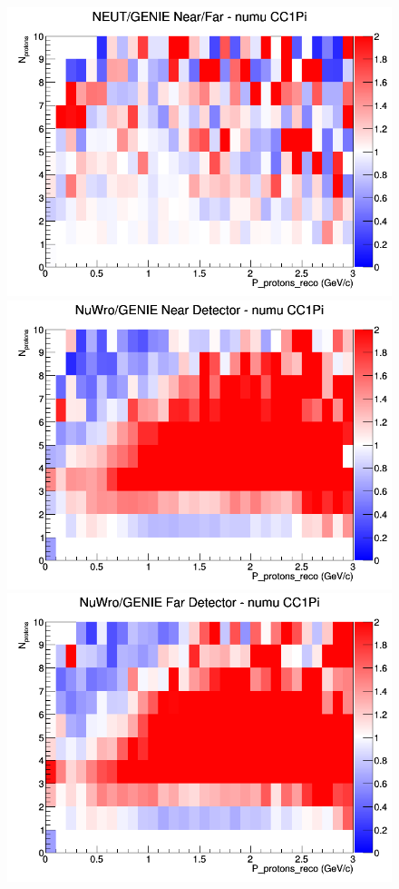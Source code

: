 \documentclass[12pt]{article}
\begin{document}
\begin{figure}[h]
\endminipage
{}
\includegraphics[width=\linewidth]{eff_N_P/LAr/protons/ratios/CC1Pi_NEUT_GENIE_numu_NF_N_P.png}
\endminipage
\newline
{}
\includegraphics[width=\linewidth]{eff_N_P/LAr/protons/ratios/CC1Pi_NuWro_GENIE_numu_near_N_P.png}
\endminipage
{}
\includegraphics[width=\linewidth]{eff_N_P/LAr/protons/ratios/CC1Pi_NuWro_GENIE_numu_far_N_P.png}

\end{figure}
\end{document}
